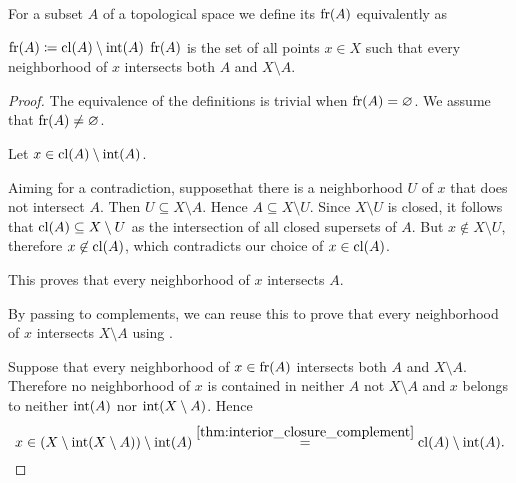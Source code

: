 \begin{definition}\label{def:topological_boundary}
  For a subset \( A \) of a topological space we define its  \( \operatorname{fr}(A) \) equivalently as
  \begin{DefEnum}
     \( \operatorname{fr}(A) \coloneqq \operatorname{cl}(A) \setminus \operatorname{int}(A) \)
     \( \operatorname{fr}(A) \) is the set of all points \( x \in X \) such that every neighborhood of \( x \) intersects both \( A \) and \( X \setminus A \).
  \end{DefEnum}
\end{definition}
\begin{proof}
  The equivalence of the definitions is trivial when \( \operatorname{fr}(A) = \varnothing \). We assume that \( \operatorname{fr}(A) \neq \varnothing \).

   Let \( x \in \operatorname{cl}(A) \setminus \operatorname{int}(A) \).

  Aiming for a contradiction, suppose\LEM that there is a neighborhood \( U \) of \( x \) that does not intersect \( A \). Then \( U \subseteq X \setminus A \). Hence \( A \subseteq X \setminus U \). Since \( X \setminus U \) is closed, it follows that \( \operatorname{cl}(A) \subseteq X \setminus U \) as the intersection of all closed supersets of \( A \). But \( x \not\in X \setminus U \), therefore \( x \not\in \operatorname{cl}(A) \), which contradicts our choice of \( x \in \operatorname{cl}(A) \).

  This proves that every neighborhood of \( x \) intersects \( A \).

  By passing to complements, we can reuse this to prove that every neighborhood of \( x \) intersects \( X \setminus A \) using .

   Suppose that every neighborhood of \( x \in \operatorname{fr}(A) \) intersects both \( A \) and \( X \setminus A \). Therefore no neighborhood of \( x \) is contained in neither \( A \) not \( X \setminus A \) and \( x \) belongs to neither \( \operatorname{int}(A) \) nor \( \operatorname{int}(X \setminus A) \). Hence
  \begin{equation*}
    x \in (X \setminus \operatorname{int}(X \setminus A)) \setminus \operatorname{int}(A) \overset {\ref{thm:interior_closure_complement}} = \operatorname{cl}(A) \setminus \operatorname{int}(A).
  \end{equation*}
\end{proof}


